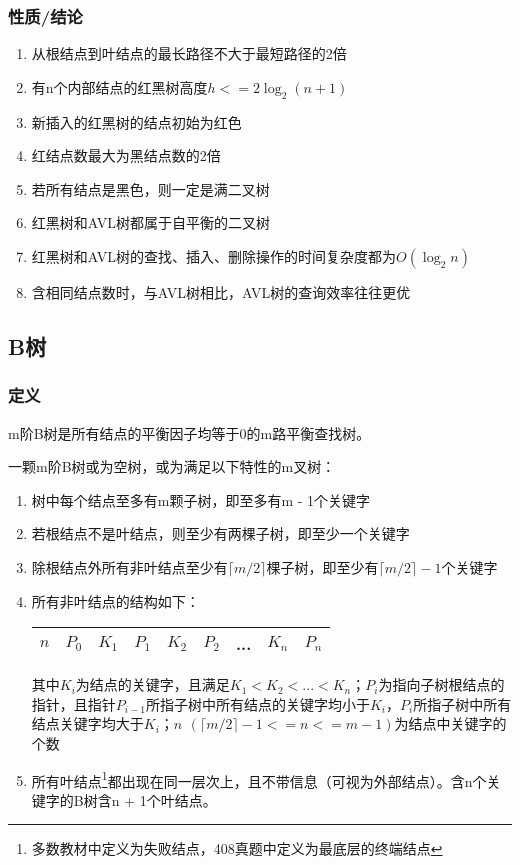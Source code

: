 \subsubsection{性质/结论}
\begin{enumerate}
    \item 从根结点到叶结点的最长路径不大于最短路径的2倍
    \item 有n个内部结点的红黑树高度\(h <= 2\log_2(n + 1)\)
    \item 新插入的红黑树的结点初始为红色
    \item 红结点数最大为黑结点数的2倍
    \item 若所有结点是黑色，则一定是满二叉树
    \item 红黑树和AVL树都属于自平衡的二叉树
    \item 红黑树和AVL树的查找、插入、删除操作的时间复杂度都为\(O(\log_2n)\)
    \item 含相同结点数时，与AVL树相比，AVL树的查询效率往往更优
\end{enumerate}


\subsection{B树}

\subsubsection{定义}
m阶B树是所有结点的平衡因子均等于0的m路平衡查找树。

一颗m阶B树或为空树，或为满足以下特性的m叉树：
\begin{enumerate}
    \item 树中每个结点至多有m颗子树，即至多有m - 1个关键字
    \item 若根结点不是叶结点，则至少有两棵子树，即至少一个关键字
    \item 除根结点外所有非叶结点至少有\(\lceil m / 2\rceil\)棵子树，即至少有\(\lceil m / 2\rceil - 1\)个关键字
    \item 所有非叶结点的结构如下：\begin{center}
        \begin{tabular}{|c|c|c|c|c|c|c|c|c|}
            \hline
            \(n\) & \(P_0\) & \(K_1\) & \(P_1\) & \(K_2\) & \(P_2\) & ... & \(K_n\) & \(P_n\) \\ 
            \hline
        \end{tabular}
    \end{center}其中\(K_i\)为结点的关键字，且满足\(K_1 < K_2 < ... < K_n\)；\(P_i\)为指向子树根结点的指针，且指针\(P_{i - 1}\)所指子树中所有结点的关键字均小于\(K_i\)，\(P_i\)所指子树中所有结点关键字均大于\(K_i\)；\(n\,\ (\lceil m / 2\rceil - 1 <= n <= m - 1)\)为结点中关键字的个数
    \item 所有叶结点\footnote{多数教材中定义为失败结点，408真题中定义为最底层的终端结点}都出现在同一层次上，且不带信息（可视为外部结点）。含n个关键字的B树含n + 1个叶结点。
\end{enumerate}


